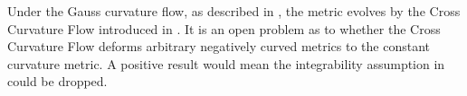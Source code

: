 \documentclass[a4paper, 12pt]{amsart}
\begin{document}
\begin{rem}
Under the Gauss curvature flow, as described in \cite[12. Application to the cross-curvature flow]{MR3344442}, the metric evolves by the Cross Curvature Flow introduced in \cite{MR2055396}. It is an open problem as to whether the Cross Curvature Flow deforms arbitrary negatively curved metrics to the constant curvature metric. A positive result would mean the integrability assumption in  could be dropped.
\end{rem}

\printbibliography
\end{document}
